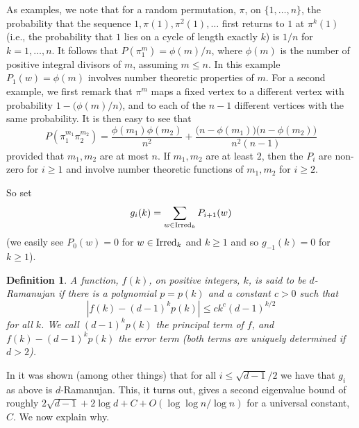 \documentclass[12pt]{article}
\newtheorem{definition}[theorem]{Definition}
\newcommand{\newa}{P}
\newcommand{\dtreelike}{{$d$-Ramanujan}}
\newcommand{\ird}[1]{{\rm Irred}_{#1}}
\begin{document}
As examples, we note that for
a random permutation, $\pi$, on $\{1,\ldots,n\}$,
the probability that the sequence $1,\pi(1),\pi^2(1),\ldots$ first returns
to $1$ at $\pi^k(1)$ (i.e., the probability that $1$ lies on a cycle of
length exactly $k$) is $1/n$ for $k=1,\ldots,n$.  It follows that
$P(\pi_1^m) = \phi(m)/n$, where $\phi(m)$ is the number of positive integral
divisors of $m$, assuming $m\le n$.  
In this example $\newa_1(w)=\phi(m)$ involves number
theoretic properties of $m$.
For a second example, we first remark that $\pi^m$ maps a fixed vertex
to a different vertex with probability $1-\bigl(\phi(m)/n\bigr)$, and to
each of the $n-1$ different vertices with the same probability.  It is
then easy to see that
$$
P(\pi_1^{m_1}\pi_2^{m_2}) =  \frac{\phi(m_1)\phi(m_2)}{n^2} +
\frac{\bigl( n-\phi(m_1) \bigr) \bigl( n-\phi(m_2) \bigr) }{n^2(n-1)}
$$
provided that $m_1,m_2$ are at most $n$.
If $m_1,m_2$ are at least $2$, then the $\newa_i$ are non-zero for $i\ge 1$
and involve number theoretic functions of $m_1,m_2$ for $i\ge 2$.

So set
\begin{equation}\label{eq:g_idef}
g_i(k)=\sum_{w\in\ird k} \newa_{i+1}(w)
\end{equation}
(we easily see $\newa_0(w)=0$ for $w\in\ird k$ and $k\ge 1$ and so
$g_{-1}(k)=0$ for $k\ge 1$).
\begin{definition}\label{de:ram}
A function, $f(k)$, on positive integers, $k$, is
said to be {\em \dtreelike} if there is a polynomial $p=p(k)$ and a
constant $c>0$ such
that
$$
|f(k)-(d-1)^kp(k)|\le ck^c(d-1)^{k/2}
$$
for all $k$.  We call $(d-1)^kp(k)$ the {\em principal term} of $f$,
and $f(k)-(d-1)^kp(k)$ the {\em error term} (both terms are uniquely
determined if $d>2$).
\end{definition} 
In \cite{friedman_random_graphs} it was shown (among other things) that
for all $i\le \sqrt{d-1}/2$ we have that $g_i$ as above is {\dtreelike}.
This, it turns out, gives a second eigenvalue bound of roughly
$2\sqrt{d-1}+2\log d+C+O(\log\log n/\log n)$ for a universal constant, $C$.
We now explain why.
\end{document}
